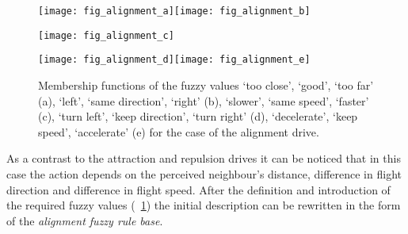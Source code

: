 \begin{figure}
	\null\vspace*{2mm}\par
	\texttt{[image: fig\_alignment\_a]}\hspace*{2mm}\texttt{[image: fig\_alignment\_b]}
	\par\vspace*{2mm}
	\texttt{[image: fig\_alignment\_c]}
	\par\vspace*{2mm}
	\texttt{[image: fig\_alignment\_d]}\hspace*{2mm}\texttt{[image: fig\_alignment\_e]}
	\par\vspace*{2mm}
	\caption{Membership functions of the fuzzy values `too close', `good', `too far' (a), `left', `same direction', `right' (b), `slower', `same speed', `faster' (c), `turn left', `keep direction', `turn right' (d), `decelerate', `keep speed', `accelerate' (e) for the case of the alignment drive.}
	\label{fig:fuzzyAnimat:Dp:afd}
\end{figure}

As a contrast to the attraction and repulsion drives it can be noticed that in this case the action depends on the perceived neighbour's distance, difference in flight direction and difference in flight speed. After the definition and introduction of the required fuzzy values (\fig~\ref{fig:fuzzyAnimat:Dp:afd}) the initial description can be rewritten in the form of the \emph{alignment fuzzy rule base}.

